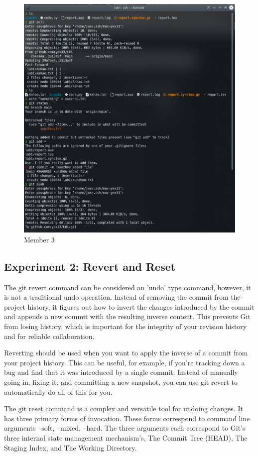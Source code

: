 \documentclass[titlepage, 12pt]{article}
\begin{document}
\begin{figure}[h]
  \includegraphics[width=\textwidth]{e1m3}
  \caption{Member 3}
\end{figure}

\newpage{}

\subsection{Experiment 2: Revert and Reset}

The git revert command can be considered an 'undo' type command, however, it is
not a traditional undo operation. Instead of removing the commit from the
project history, it figures out how to invert the changes introduced by the
commit and appends a new commit with the resulting inverse content. This
prevents Git from losing history, which is important for the integrity of your
revision history and for reliable collaboration.

Reverting should be used when you want to apply the inverse of a commit from
your project history. This can be useful, for example, if you’re tracking down a
bug and find that it was introduced by a single commit. Instead of manually
going in, fixing it, and committing a new snapshot, you can use git revert to
automatically do all of this for you.

The git reset command is a complex and versatile tool for undoing changes. It
has three primary forms of invocation. These forms correspond to command line
arguments --soft, --mixed, --hard. The three arguments each correspond to Git's
three internal state management mechanism's, The Commit Tree (HEAD), The Staging
Index, and The Working Directory.
\end{document}
